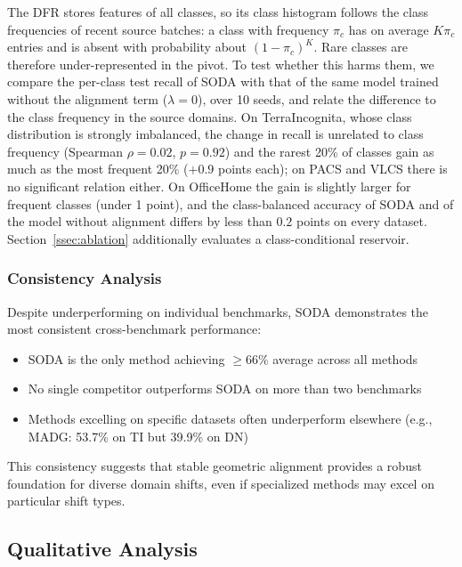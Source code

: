 The DFR stores features of all classes, so its class histogram follows the class frequencies of recent source batches: a class with frequency $\pi_c$ has on average $K\pi_c$ entries and is absent with probability about $(1-\pi_c)^K$. Rare classes are therefore under-represented in the pivot. To test whether this harms them, we compare the per-class test recall of SODA with that of the same model trained without the alignment term ($\lambda=0$), over 10 seeds, and relate the difference to the class frequency in the source domains. On TerraIncognita, whose class distribution is strongly imbalanced, the change in recall is unrelated to class frequency (Spearman $\rho=0.02$, $p=0.92$) and the rarest 20\% of classes gain as much as the most frequent 20\% ($+0.9$ points each); on PACS and VLCS there is no significant relation either. On OfficeHome the gain is slightly larger for frequent classes (under 1 point), and the class-balanced accuracy of SODA and of the model without alignment differs by less than $0.2$ points on every dataset. Section~\ref{ssec:ablation} additionally evaluates a class-conditional reservoir.

\subsubsection{Consistency Analysis}

Despite underperforming on individual benchmarks, SODA demonstrates the most consistent cross-benchmark performance:

\begin{itemize}
    \item SODA is the only method achieving $\geq 66\%$ average across all methods
    \item No single competitor outperforms SODA on more than two benchmarks
    \item Methods excelling on specific datasets often underperform elsewhere (e.g., MADG: 53.7\% on TI but 39.9\% on DN)
\end{itemize}

This consistency suggests that stable geometric alignment provides a robust foundation for diverse domain shifts, even if specialized methods may excel on particular shift types.

\subsection{Qualitative Analysis}
\label{ssec:visualization}

